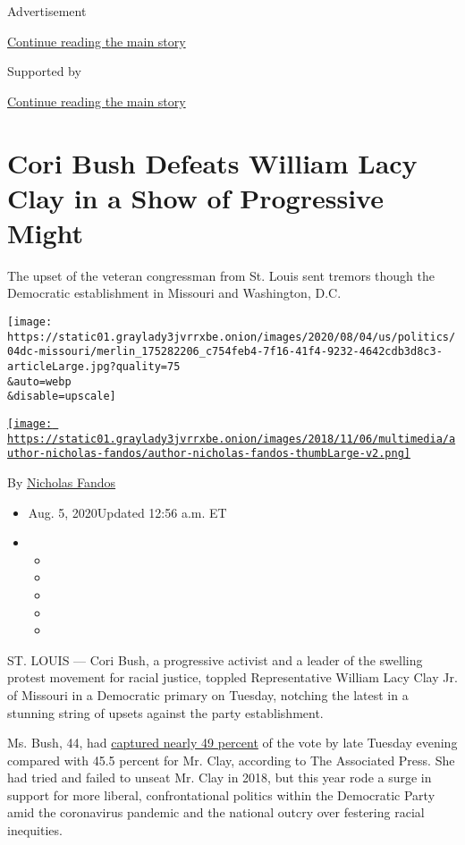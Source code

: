 Advertisement

\protect\hyperlink{after-top}{Continue reading the main story}

Supported by

\protect\hyperlink{after-sponsor}{Continue reading the main story}

\hypertarget{cori-bush-defeats-william-lacy-clay-in-a-show-of-progressive-might}{%
\section{Cori Bush Defeats William Lacy Clay in a Show of Progressive
Might}\label{cori-bush-defeats-william-lacy-clay-in-a-show-of-progressive-might}}

The upset of the veteran congressman from St. Louis sent tremors though
the Democratic establishment in Missouri and Washington, D.C.

\texttt{[image: https://static01.graylady3jvrrxbe.onion/images/2020/08/04/us/politics/04dc-missouri/merlin\_175282206\_c754feb4-7f16-41f4-9232-4642cdb3d8c3-articleLarge.jpg?quality=75\\\&auto=webp\\\&disable=upscale]}

\href{https://www.nytimes3xbfgragh.onion/by/nicholas-fandos}{\texttt{[image: https://static01.graylady3jvrrxbe.onion/images/2018/11/06/multimedia/author-nicholas-fandos/author-nicholas-fandos-thumbLarge-v2.png]}}

By \href{https://www.nytimes3xbfgragh.onion/by/nicholas-fandos}{Nicholas
Fandos}

\begin{itemize}
\item
  Aug. 5, 2020Updated 12:56 a.m. ET
\item
  \begin{itemize}
  \item
  \item
  \item
  \item
  \item
  \end{itemize}
\end{itemize}

ST. LOUIS --- Cori Bush, a progressive activist and a leader of the
swelling protest movement for racial justice, toppled Representative
William Lacy Clay Jr. of Missouri in a Democratic primary on Tuesday,
notching the latest in a stunning string of upsets against the party
establishment.

Ms. Bush, 44, had
\href{https://www.nytimes3xbfgragh.onion/interactive/2020/08/04/us/elections/results-missouri-house-district-1-primary-election.html}{captured
nearly 49 percent} of the vote by late Tuesday evening compared with
45.5 percent for Mr. Clay, according to The Associated Press. She had
tried and failed to unseat Mr. Clay in 2018, but this year rode a surge
in support for more liberal, confrontational politics within the
Democratic Party amid the coronavirus pandemic and the national outcry
over festering racial inequities.

